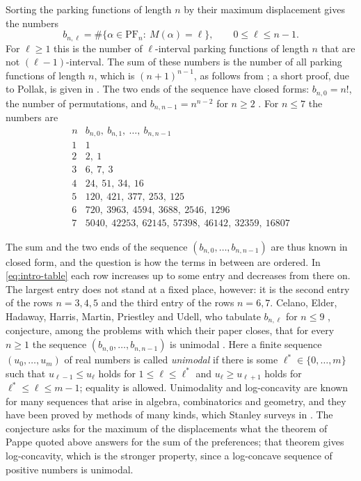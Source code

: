 \documentclass{amsart}
\theoremstyle{definition}
\theoremstyle{remark}
\numberwithin{equation}{section}
\begin{document}
Sorting the parking functions of length $n$ by their maximum displacement gives the numbers
\[
b_{n,\ell}=\#\{\alpha\in\mathrm{PF}_n:\ M(\alpha)=\ell\},\qquad 0\le\ell\le n-1.
\]
For $\ell\ge 1$ this is the number of $\ell$-interval parking functions of length $n$ that are not $(\ell-1)$-interval. The sum of these numbers is the number of all parking functions of length $n$, which is $(n+1)^{n-1}$, as follows from \cite[Lemma~2 and (6.1)]{konheimweiss1966}; a short proof, due to Pollak, is given in \cite[Section~2]{foatariordan1974}. The two ends of the sequence have closed forms: $b_{n,0}=n!$, the number of permutations, and $b_{n,n-1}=n^{n-2}$ for $n\ge 2$ \cite[Example~2.8 and Section~6]{celano2025}. For $n\le 7$ the numbers are
\begin{equation}\label{eq:intro-table}
\begin{array}{c|l}
n & b_{n,0},\ b_{n,1},\ \dots,\ b_{n,n-1}\\ \hline
1 & 1\\
2 & 2,\ 1\\
3 & 6,\ 7,\ 3\\
4 & 24,\ 51,\ 34,\ 16\\
5 & 120,\ 421,\ 377,\ 253,\ 125\\
6 & 720,\ 3963,\ 4594,\ 3688,\ 2546,\ 1296\\
7 & 5040,\ 42253,\ 62145,\ 57398,\ 46142,\ 32359,\ 16807
\end{array}
\end{equation}

The sum and the two ends of the sequence $(b_{n,0},\dots,b_{n,n-1})$ are thus known in closed form, and the question is how the terms in between are ordered. In \eqref{eq:intro-table} each row increases up to some entry and decreases from there on. The largest entry does not stand at a fixed place, however: it is the second entry of the rows $n=3,4,5$ and the third entry of the rows $n=6,7$. Celano, Elder, Hadaway, Harris, Martin, Priestley and Udell, who tabulate $b_{n,\ell}$ for $n\le 9$ \cite[Table~1]{celano2025}, conjecture, among the problems with which their paper closes, that for every $n\ge 1$ the sequence $(b_{n,0},\dots,b_{n,n-1})$ is unimodal \cite[Conjecture~6.5]{celano2025}. Here a finite sequence $(u_0,\dots,u_m)$ of real numbers is called \emph{unimodal} if there is some $\ell^*\in\{0,\dots,m\}$ such that $u_{\ell-1}\le u_\ell$ holds for $1\le\ell\le\ell^*$ and $u_\ell\ge u_{\ell+1}$ holds for $\ell^*\le\ell\le m-1$; equality is allowed. Unimodality and log-concavity are known for many sequences that arise in algebra, combinatorics and geometry, and they have been proved by methods of many kinds, which Stanley surveys in \cite{stanley1989}. The conjecture asks for the maximum of the displacements what the theorem of Pappe quoted above answers for the sum of the preferences; that theorem gives log-concavity, which is the stronger property, since a log-concave sequence of positive numbers is unimodal.
\end{document}
